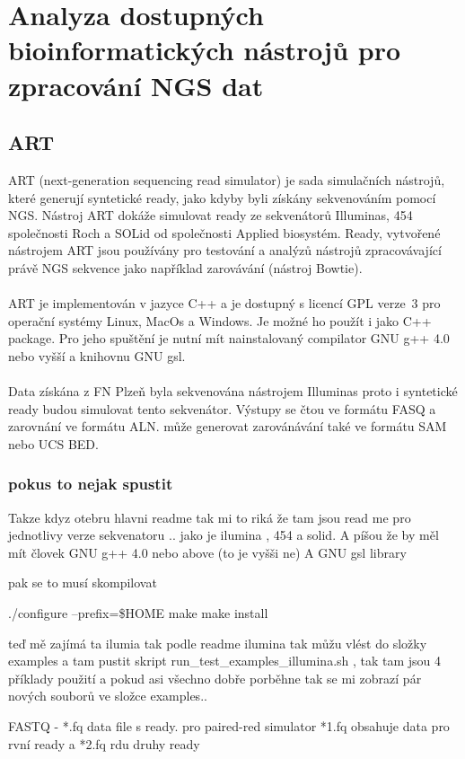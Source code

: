 \documentclass[czech,DP]{thesiskiv}
\begin{document}
\chapter{Analyza dostupných bioinformatických nástrojů pro zpracování NGS dat}

\section{ART}
ART (next-generation sequencing read simulator) je sada simulačních nástrojů, které generují syntetické ready, jako kdyby byli získány sekvenováním pomocí NGS. Nástroj ART dokáže simulovat ready ze sekvenátorů Illuminas, 454 společnosti Roch a SOLid od společnosti Applied biosystém. Ready, vytvořené nástrojem ART jsou používány pro testování a analýzů nástrojů zpracovávající právě NGS sekvence jako například zarovávání (nástroj Bowtie). 
\\
\\
ART je implementován v jazyce C++ a je dostupný s licencí GPL verze~3 pro operační systémy Linux, MacOs a Windows. Je možné ho použít i jako C++ package. Pro jeho spuštění je nutní mít nainstalovaný compilator GNU g++ 4.0 nebo vyšší a knihovnu GNU gsl. 
\\
\\
Data získána z FN Plzeň byla sekvenována nástrojem Illuminas proto i syntetické ready budou simulovat tento sekvenátor.    
 Výstupy se čtou ve formátu FASQ a zarovnání ve formátu ALN. může generovat zarovánávání také ve formátu SAM nebo UCS BED. \cite{art}

\subsection{pokus to nejak spustit}
Takze kdyz otebru hlavni readme tak mi to riká že tam jsou read me pro jednotlivy verze sekvenatoru .. jako je ilumina , 454 a solid.
A píšou že by měl mít človek GNU g++ 4.0 nebo above (to je vyšši ne)
A GNU gsl library

pak se to musí skompilovat 

./configure --prefix=\$HOME
	       	make
	       	make install	 
	 
teď mě zajímá ta ilumia tak podle readme ilumina tak můžu vlést do složky examples a tam pustit skript run\_test\_examples\_illumina.sh , tak tam jsou 4 příklady použití 
a pokud asi všechno dobře porběhne tak se mi zobrazí pár nových souborů ve složce examples.. 

FASTQ - *.fq data file s ready. pro paired-red simulator
*1.fq obsahuje data pro rvní ready a *2.fq rdu druhy ready
\end{document}
